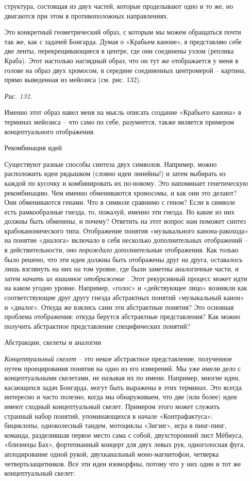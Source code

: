 \documentclass[../main.tex]{subfiles}
\begin{document}
структура, состоящая из двух частей, которые проделывают одно и то же, но двигаются при этом в противоположных направлениях.

Это конкретный геометрический образ, с которым мы можем обращаться почти так же, как с задачей Бонгарда. Думая о «Крабьем каноне», я представляю себе две ленты, перекрещивающиеся в центре, где они соединены узлом (реплика Краба). Этот настолько наглядный образ, что он тут же отображается у меня в голове на образ двух хромосом, в середине соединенных центромерой \--- картина, прямо выведенная из мейозиса (см. рис. 132).

\emph{Рис. 132.}

Именно этот образ навел меня на мысль описать создание «Крабьего канона» в терминах мейозиса \--- что само по себе, разумеется, также является примером концептуального отображения.

Рекомбинация идей

Существуют разные способы синтеза двух символов. Например, можно расположить идеи рядышком (словно идеи линейны!) и затем выбирать из каждой по кусочку и комбинировать их по-новому. Это напоминает генетическую рекомбинацию. Чем именно обмениваются хромосомы, и как они это делают? Они обмениваются генами. Что в символе сравнимо с геном? Если в символе есть рамкообразные гнезда, то, пожалуй, именно эти гнезда. Но какие из них должны быть обменены, и почему? Ответить на этот вопрос нам поможет синтез крабоканонического типа. Отображение понятия «музыкального канона-ракохода» на понятие «диалога» включало в себя несколько дополнительных отображений \--- в действительности, оно \emph{порождало} дополнительные отображения. Как только было решено, что эти идеи должны быть отображены друг на друга, оставалось лишь взглянуть на них на том уровне, где были заметны аналогичные части, и затем \emph{начать их взаимное отображение} . Этот рекурсивный процесс может идти на каком угодно уровне. Например, «голос» и «действующее лицо» возникли как соответствующие друг другу гнезда абстрактных понятий «музыкальный канон» и «диалог». Откуда же взялись сами эти абстрактные понятия? Это основная проблема отображения: откуда берутся абстрактные представления? Как можно получить абстрактное представление специфических понятий?

Абстракции, скелеты и аналогии

\emph{Концептуальный скелет} \--- это некое абстрактное представление, полученное путем проецирования понятия на одно из его измерений. Мы уже имели дело с концептуальными скелетами, не называя их по имени. Например, многие идеи, касающихся задач Бонгарда, могут быть выражены в этих терминах. Это всегда интересно и часто полезно, когда мы обнаруживаем, что две (или более) идеи имеют сходный концептуальный скелет. Примером этого может служить странный набор понятий, упоминающихся в начале «Контрафактуса»: бициклопы, одноколесный тандем, мотоциклы «Зигзиг», игра в пинг-пинг, команда, разделившая первое место сама с собой, двухсторонний лист Мёбиуса, «близнецы Бах», фортепианный концерт для двух левых рук, одноголосная фуга, аплодирование одной рукой, двухканальный моно-магнитофон, четверка четвертьзащитников. Все эти идеи изоморфны, потому что у них один и тот же концептуальный скелет:
\end{document}
